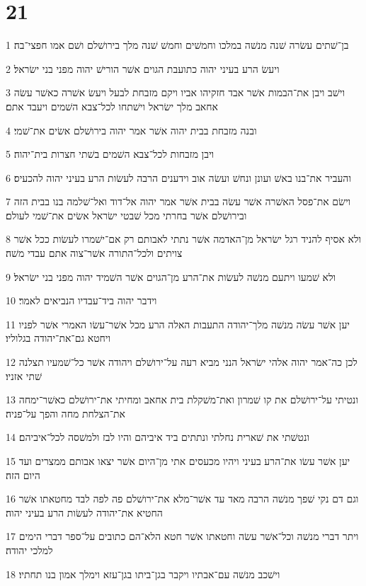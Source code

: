 \chapter{21}

\par 1 בן־שׁתים עשׂרה שׁנה מנשׁה במלכו וחמשׁים וחמשׁ שׁנה מלך בירושׁלם ושׁם אמו חפצי־בה׃
\par 2 ויעשׂ הרע בעיני יהוה כתועבת הגוים אשׁר הורישׁ יהוה מפני בני ישׂראל׃
\par 3 וישׁב ויבן את־הבמות אשׁר אבד חזקיהו אביו ויקם מזבחת לבעל ויעשׂ אשׁרה כאשׁר עשׂה אחאב מלך ישׂראל וישׁתחו לכל־צבא השׁמים ויעבד אתם׃
\par 4 ובנה מזבחת בבית יהוה אשׁר אמר יהוה בירושׁלם אשׂים את־שׁמי׃
\par 5 ויבן מזבחות לכל־צבא השׁמים בשׁתי חצרות בית־יהוה׃
\par 6 והעביר את־בנו באשׁ ועונן ונחשׁ ועשׂה אוב וידענים הרבה לעשׂות הרע בעיני יהוה להכעיס׃
\par 7 וישׂם את־פסל האשׁרה אשׁר עשׂה בבית אשׁר אמר יהוה אל־דוד ואל־שׁלמה בנו בבית הזה ובירושׁלם אשׁר בחרתי מכל שׁבטי ישׂראל אשׂים את־שׁמי לעולם׃
\par 8 ולא אסיף להניד רגל ישׂראל מן־האדמה אשׁר נתתי לאבותם רק אם־ישׁמרו לעשׂות ככל אשׁר צויתים ולכל־התורה אשׁר־צוה אתם עבדי משׁה׃
\par 9 ולא שׁמעו ויתעם מנשׁה לעשׂות את־הרע מן־הגוים אשׁר השׁמיד יהוה מפני בני ישׂראל׃
\par 10 וידבר יהוה ביד־עבדיו הנביאים לאמר׃
\par 11 יען אשׁר עשׂה מנשׁה מלך־יהודה התעבות האלה הרע מכל אשׁר־עשׂו האמרי אשׁר לפניו ויחטא גם־את־יהודה בגלוליו׃
\par 12 לכן כה־אמר יהוה אלהי ישׂראל הנני מביא רעה על־ירושׁלם ויהודה אשׁר כל־שׁמעיו תצלנה שׁתי אזניו׃
\par 13 ונטיתי על־ירושׁלם את קו שׁמרון ואת־משׁקלת בית אחאב ומחיתי את־ירושׁלם כאשׁר־ימחה את־הצלחת מחה והפך על־פניה׃
\par 14 ונטשׁתי את שׁארית נחלתי ונתתים ביד איביהם והיו לבז ולמשׁסה לכל־איביהם׃
\par 15 יען אשׁר עשׂו את־הרע בעיני ויהיו מכעסים אתי מן־היום אשׁר יצאו אבותם ממצרים ועד היום הזה׃
\par 16 וגם דם נקי שׁפך מנשׁה הרבה מאד עד אשׁר־מלא את־ירושׁלם פה לפה לבד מחטאתו אשׁר החטיא את־יהודה לעשׂות הרע בעיני יהוה׃
\par 17 ויתר דברי מנשׁה וכל־אשׁר עשׂה וחטאתו אשׁר חטא הלא־הם כתובים על־ספר דברי הימים למלכי יהודה׃
\par 18 וישׁכב מנשׁה עם־אבתיו ויקבר בגן־ביתו בגן־עזא וימלך אמון בנו תחתיו׃
